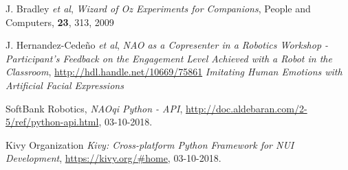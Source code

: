 \documentclass{article}
\begin{document}
\begin{thebibliography}{3}
 J. Bradley \textit{et al}, {\em Wizard of Oz Experiments for Companions}, People and Computers, {\bf 23}, 313, 2009

 J. Hernandez-Cedeño \textit{et al}, {\em NAO as a Copresenter in a Robotics Workshop - Participant’s Feedback on the Engagement Level Achieved with a Robot in the Classroom}, \url{http://hdl.handle.net/10669/75861}
 {\em Imitating Human Emotions with Artificial Facial Expressions}

 SoftBank Robotics, {\em NAOqi Python - API},  \url{http://doc.aldebaran.com/2-5/ref/python-api.html}, 03-10-2018.

 Kivy Organization {\em Kivy: Cross-platform Python Framework for NUI Development}, \url{https://kivy.org/#home}, 03-10-2018.

\end{thebibliography}
\end{document}
